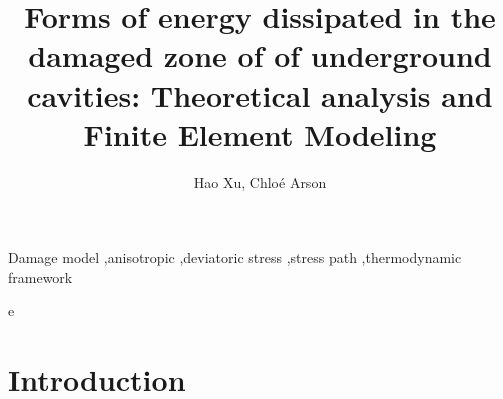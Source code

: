 \documentclass[preprint,review,12pt]{elsarticle}
\begin{document}
\begin{frontmatter}



\title{Forms of energy dissipated in the damaged zone of of underground cavities: Theoretical analysis and Finite Element Modeling}


\author{Hao Xu, Chlo\'e Arson}

\address{School of Civil and Environmental Engineering,
Georgia Institute of Technology, Atlanta, Georgia 30332, U.S.A.}

\begin{abstract}


\end{abstract}

\begin{keyword}
Damage model \sep anisotropic \sep deviatoric stress \sep stress path
\sep thermodynamic framework

e\end{keyword}

\end{frontmatter}



\section{Introduction}
\end{document}

